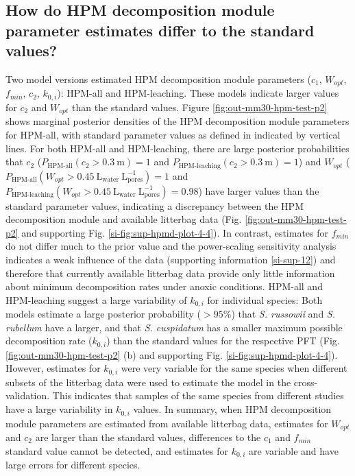 \documentclass[esd, manuscript]{copernicus}
\begin{document}
\subsection{How do HPM decomposition module parameter estimates differ to the standard values?}

Two model versions estimated HPM decomposition module parameters (\(c_1\), \(W_{opt}\), \(f_{min}\), \(c_2\), \(k_{0,i}\)): HPM-all and HPM-leaching. These models indicate larger values for \(c_2\) and \(W_{opt}\) than the standard values. Figure \ref{fig:out-mm30-hpm-test-p2} shows marginal posterior densities of the HPM decomposition module parameters for HPM-all, with standard parameter values as defined in \citet{Frolking.2010} indicated by vertical lines. For both HPM-all and HPM-leaching, there are large posterior probabilities that \(c_2\) (\(P_\text{HPM-all}(c_2>0.3~\mathrm{m}) = 1\) and \(P_\text{HPM-leaching}(c_2>0.3~\mathrm{m}) = 1\)) and \(W_{opt}\) (\(P_\text{HPM-all}(W_{opt}>0.45~\mathrm{L}_\mathrm{water}~\mathrm{L}_\mathrm{pores}^{-1}) = 1\) and \(P_\text{HPM-leaching}(W_{opt}>0.45~\mathrm{L}_\mathrm{water}~\mathrm{L}_\mathrm{pores}^{-1}) = 0.98\)) have larger values than the standard parameter values, indicating a discrepancy between the HPM decomposition module and available litterbag data (Fig. \ref{fig:out-mm30-hpm-test-p2} and supporting Fig. \ref{si-fig:sup-hpmd-plot-4-4}). In contrast, estimates for \(f_{min}\) do not differ much to the prior value and the power-scaling sensitivity analysis indicates a weak influence of the data (supporting information \ref{si-sup-12}) and therefore that currently available litterbag data provide only little information about minimum decomposition rates under anoxic conditions. HPM-all and HPM-leaching suggest a large variability of \(k_{0,i}\) for individual species: Both models estimate a large posterior probability (\(>95\)\%) that \emph{S. russowii} and \emph{S. rubellum} have a larger, and that \emph{S. cuspidatum} has a smaller maximum possible decomposition rate (\(k_{0,i}\)) than the standard values for the respective PFT (Fig. \ref{fig:out-mm30-hpm-test-p2} (b) and supporting Fig. \ref{si-fig:sup-hpmd-plot-4-4}). However, estimates for \(k_{0,i}\) were very variable for the same species when different subsets of the litterbag data were used to estimate the model in the cross-validation. This indicates that samples of the same species from different studies have a large variability in \(k_{0,i}\) values. In summary, when HPM decomposition module parameters are estimated from available litterbag data, estimates for \(W_{opt}\) and \(c_2\) are larger than the standard values, differences to the \(c_1\) and \(f_{min}\) standard value cannot be detected, and estimates for \(k_{0,i}\) are variable and have large errors for different species.
\end{document}

